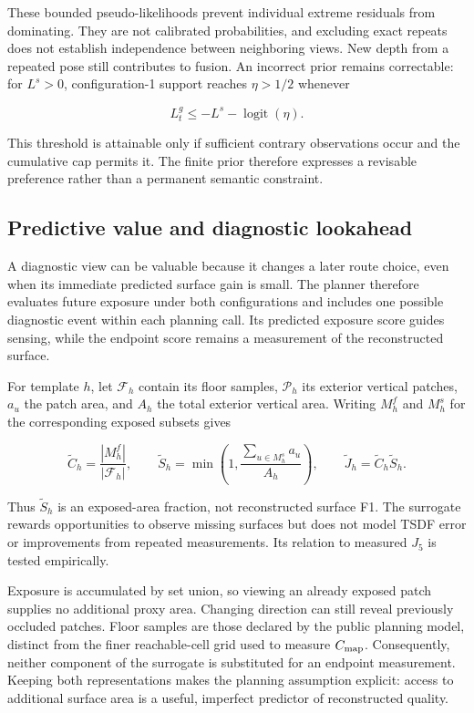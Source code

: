 These bounded pseudo-likelihoods prevent individual extreme residuals from dominating. They are not calibrated probabilities, and excluding exact repeats does not establish independence between neighboring views. New depth from a repeated pose still contributes to fusion. An incorrect prior remains correctable: for \(L^s>0\), configuration-1 support reaches \(\eta>1/2\) whenever

\[
L_t^g\le-L^s-\operatorname{logit}(\eta).
\]

This threshold is attainable only if sufficient contrary observations occur and the cumulative cap permits it. The finite prior therefore expresses a revisable preference rather than a permanent semantic constraint.

\hypertarget{predictive-value-and-diagnostic-lookahead}{%
\subsection{Predictive value and diagnostic lookahead}\label{predictive-value-and-diagnostic-lookahead}}

A diagnostic view can be valuable because it changes a later route choice, even when its immediate predicted surface gain is small. The planner therefore evaluates future exposure under both configurations and includes one possible diagnostic event within each planning call. Its predicted exposure score guides sensing, while the endpoint score remains a measurement of the reconstructed surface.

For template \(h\), let \(\mathcal F_h\) contain its floor samples, \(\mathcal P_h\) its exterior vertical patches, \(a_u\) the patch area, and \(A_h\) the total exterior vertical area. Writing \(M_h^f\) and \(M_h^s\) for the corresponding exposed subsets gives

\[
\widetilde C_h=\frac{|M_h^f|}{|\mathcal F_h|},\qquad
\widetilde S_h=\min\left(1,\frac{\sum_{u\in M_h^s}a_u}{A_h}\right),\qquad
\widetilde J_h=\widetilde C_h\widetilde S_h.
\]

Thus \(\widetilde S_h\) is an exposed-area fraction, not reconstructed surface F1. The surrogate rewards opportunities to observe missing surfaces but does not model TSDF error or improvements from repeated measurements. Its relation to measured \(J_5\) is tested empirically.

Exposure is accumulated by set union, so viewing an already exposed patch supplies no additional proxy area. Changing direction can still reveal previously occluded patches. Floor samples are those declared by the public planning model, distinct from the finer reachable-cell grid used to measure \(C_{\rm map}\). Consequently, neither component of the surrogate is substituted for an endpoint measurement. Keeping both representations makes the planning assumption explicit: access to additional surface area is a useful, imperfect predictor of reconstructed quality.

